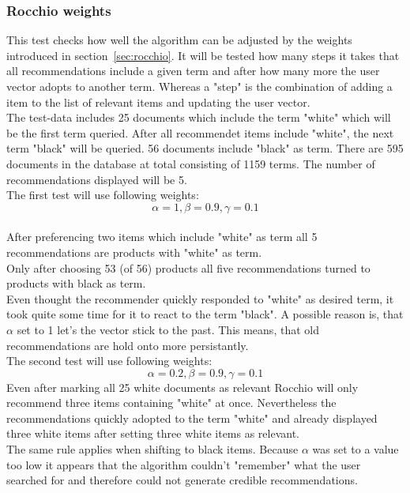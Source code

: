 \subsubsection{Rocchio weights}
This test checks how well the algorithm can be adjusted by the weights introduced in section~\ref{sec:rocchio}.
It will be tested how many steps it takes that all recommendations include a given term and after how many more the user vector adopts to another term.
Whereas a "step" is the combination of adding a item to the list of relevant items and updating the user vector.
\\
The test-data includes 25 documents which include the term "white" which will be the first term queried.
After all recommendet items include "white", the next term "black" will be queried.
56 documents include "black" as term.
There are 595 documents in the database at total consisting of 1159 terms.
The number of recommendations displayed will be 5.
\\

\noindent
The first test will use following weights:
\\
$$\alpha = 1, \beta = 0.9, \gamma = 0.1$$
\\
After preferencing two items which include "white" as term all 5 recommendations are products with "white" as term.
\\
Only after choosing 53 (of 56) products all five recommendations turned to products with black as term.
\\
Even thought the recommender quickly responded to "white" as desired term, it took quite some time for it to react to the term "black".
A possible reason is, that $\alpha$ set to 1 let's the vector stick to the past.
This means, that old recommendations are hold onto more persistantly.
\\

\noindent
The second test will use following weights:
\\
$$\alpha = 0.2, \beta = 0.9, \gamma = 0.1$$
Even after marking all 25 white documents as relevant Rocchio will only recommend three items containing "white" at once.
Nevertheless the recommendations quickly adopted to the term "white" and already displayed three white items after setting three white items as relevant.
\\
The same rule applies when shifting to black items.
Because $\alpha$ was set to a value too low it appears that the algorithm couldn't "remember" what the user searched for and therefore could not generate credible recommendations.
\\

